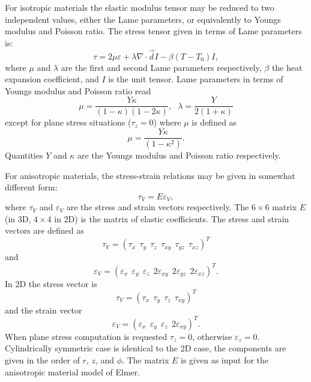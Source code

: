 \begin{versiona}
For isotropic materials the elastic modulus tensor may be reduced to
two independent values, either the Lame parameters, or equivalently
to Youngs modulus and Poisson ratio. The stress tensor given 
in terms of Lame parameters is:
\begin{equation}
\tau = 2 \mu \varepsilon + \lambda\nabla\cdot\Vec{d} I - \beta(T-T_0)I,
\end{equation}
where $\mu$ and $\lambda$ are the first and second Lame parameters respectively,
$\beta$ the heat expansion coefficient,
and $I$ is the unit tensor. Lame parameters in terms of Youngs modulus and
Poisson ratio read
\begin{equation}
 \mu = \frac{Y \kappa}{( 1 - \kappa ) ( 1-2\kappa )},\ \ \  
 \lambda = \frac{Y}{2(1+\kappa)}
\end{equation}
except for plane stress situations ($\tau_z=0$) where $\mu$ is defined as
\begin{equation}
 \mu = \frac{Y \kappa}{( 1 - \kappa^2 ) }.
\end{equation}
Quantities $Y$ and $\kappa$ are the Youngs modulus and Poisson ratio respectively.

For anisotropic materials, the stress-strain relations may be given in somewhat different
form:
\begin{equation}
\tau_V = E \varepsilon_V,
\end{equation}
where $\tau_V$ and $\varepsilon_V$ are the stress and strain vectors respectively.
The $6\times6$ matrix $E$ (in 3D, $4\times4$ in 2D) is the matrix of elastic
coefficients. The stress and strain vectors are defined as
\begin{equation}
\tau_V = \left( \tau_x\ \ \tau_y\ \ \tau_z\ \ \tau_{xy}\ \ \tau_{yz}\ \ \tau_{xz} \right)^T
\end{equation}
and
\begin{equation}
\varepsilon_V = \left( \varepsilon_x\ \ \varepsilon_y\ \ \varepsilon_z\ \  
2\varepsilon_{xy}\ \ 2\varepsilon_{yz}\ \ 2\varepsilon_{xz} \right)^T.
\end{equation}
In 2D the stress vector is
\begin{equation}
\tau_V = \left( \tau_x\ \ \tau_y\ \ \tau_z\ \ \tau_{xy} \right)^T
\end{equation}
and the strain vector
\begin{equation}
\varepsilon_V = \left( \varepsilon_x\ \ \varepsilon_y\ \ \varepsilon_z\ \ 2\varepsilon_{xy}\right)^T.
\end{equation}
When plane stress computation is requested  $\tau_z=0$, otherwise $\varepsilon_z=0$.
Cylindrically symmetric case is identical to the 2D case, the components are given
in the order of $r$, $z$, and $\phi$. The matrix $E$ is given as input for
the anisotropic material model of Elmer.


\end{versiona}
